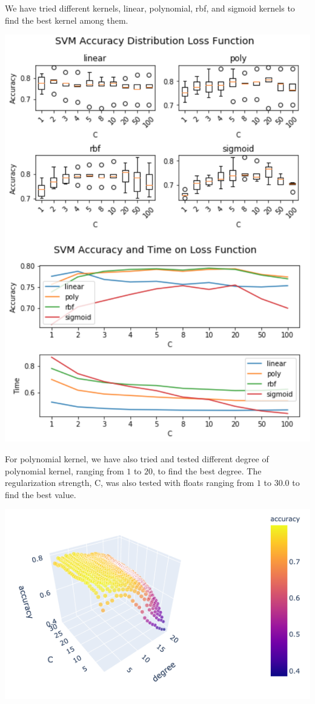 \documentclass[11.5pt]{article}
\begin{document}
\begin{enumerate}
\begin{itemize}
\begin{enumerate}
                We have tried different kernels, linear, polynomial, rbf, and sigmoid kernels to find the best kernel among them.

                \includegraphics[width=0.75\linewidth]{images/svm_kernel.png}

                For polynomial kernel, we have also tried and tested different degree of polynomial kernel, ranging from $1$ to $20$, to find the best degree.
                The regularization strength, C, was also tested with floats ranging from $1$ to $30.0$ to find the best value.

                \includegraphics[width=\linewidth]{images/svm_c_degree.png}


\end{enumerate}
\end{itemize}
\end{enumerate}
\end{document}
